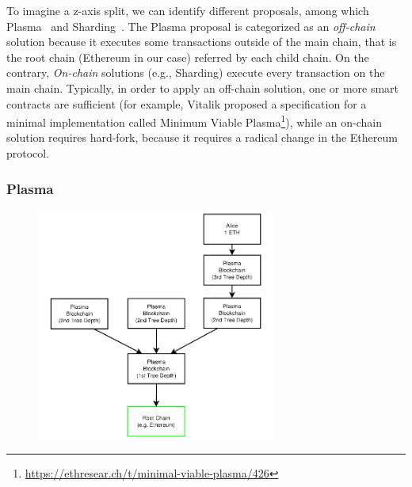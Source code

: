 To imagine a z-axis split, we can identify different proposals, among which
Plasma~\cite{poon2017plasma} and Sharding~\cite{bib:mauve, bib:sharding-faq}.
The Plasma proposal is categorized as an \emph{off-chain} solution because it
executes some transactions outside of the main chain, that is the root chain
(Ethereum in our case) referred by each child chain. On the contrary,
\emph{On-chain} solutions (e.g., Sharding) execute every transaction on
the main chain. Typically, in order to apply an off-chain solution, one or more
smart contracts are sufficient (for example, Vitalik proposed a specification
for a minimal implementation called Minimum Viable
Plasma\footnote{\url{https://ethresear.ch/t/minimal-viable-plasma/426}}), while
an on-chain solution requires hard-fork, because it requires a radical change
in the Ethereum protocol.

\subsubsection{Plasma}

\begin{figure}[t]
    \begin{center}
        \includegraphics[width=0.7\textwidth]{./res/img/plasma}
        \label{fig:plasma}
    \end{center}
\end{figure}

